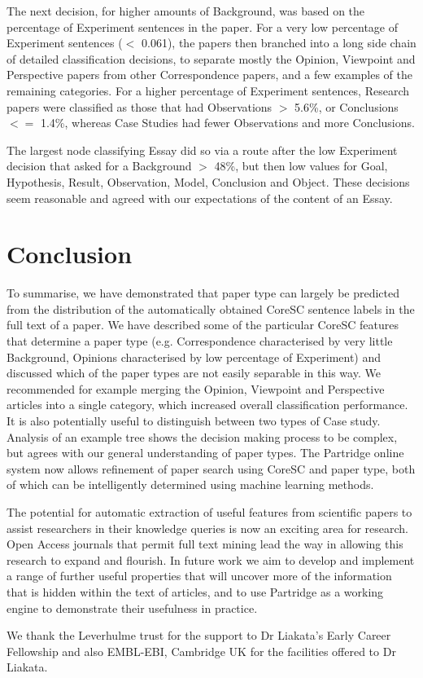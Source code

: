 \documentclass{svmult}
\begin{document}
The next decision, for higher amounts of Background, was based on the
percentage of Experiment sentences in the paper. For a very low
percentage of Experiment sentences ($<$ 0.061), the papers then
branched into a long side chain of detailed classification decisions,
to separate mostly the Opinion, Viewpoint and Perspective papers from
other Correspondence papers, and a few examples of the remaining
categories. For a higher percentage of Experiment sentences, Research
papers were classified as those that had Observations $>$ 5.6\%, or
Conclusions $<=$ 1.4\%, whereas Case Studies had fewer Observations
and more Conclusions.

The largest node classifying Essay did so via a route after the low
Experiment decision that asked for a Background $>$ 48\%, but then low
values for Goal, Hypothesis, Result, Observation, Model, Conclusion
and Object. These decisions seem reasonable and agreed with our
expectations of the content of an Essay.

\vspace{-15pt}
\section{Conclusion}
\label{sec:4}

To summarise, we have demonstrated that paper type can largely be
predicted from the distribution of the automatically obtained CoreSC
sentence labels in the full text of a paper. We have described some of
the particular CoreSC features that determine a paper type
(e.g. Correspondence characterised by very little Background, Opinions
characterised by low percentage of Experiment) and discussed which of
the paper types are not easily separable in this way. We recommended
for example merging the Opinion, Viewpoint and Perspective articles
into a single category, which increased overall
classification performance. It is also potentially useful to distinguish between two types of Case study.
Analysis of an example tree shows the decision making
process to be complex, but agrees with our general understanding of
paper types. The Partridge online system now allows refinement of
paper search using CoreSC and paper type, both of which can be
intelligently determined using machine learning methods.



The potential for automatic extraction of useful features from
scientific papers to assist researchers in their knowledge queries is
now an exciting area for research. Open Access journals that permit
full text mining lead the way in allowing this research to expand and
flourish. In future work we aim to develop and implement a range of
further useful properties that will uncover more of the information
that is hidden within the text of articles, and to use Partridge as a
working engine to demonstrate their usefulness in practice.


\begin{acknowledgement} We thank the Leverhulme trust for the support to Dr
Liakata's Early Career Fellowship and also EMBL-EBI, Cambridge UK for the
facilities offered to Dr Liakata.  \end{acknowledgement}


\vspace{-15pt}



%
\end{document}
